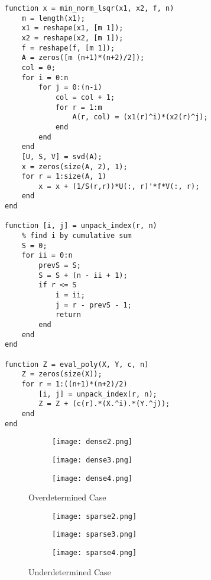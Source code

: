 \documentclass{template}
\begin{document}
\begin{verbatim}
function x = min_norm_lsqr(x1, x2, f, n)
    m = length(x1);
    x1 = reshape(x1, [m 1]);
    x2 = reshape(x2, [m 1]);
    f = reshape(f, [m 1]);
    A = zeros([m (n+1)*(n+2)/2]);
    col = 0;
    for i = 0:n
        for j = 0:(n-i)
            col = col + 1;
            for r = 1:m
                A(r, col) = (x1(r)^i)*(x2(r)^j);
            end
        end
    end
    [U, S, V] = svd(A);
    x = zeros(size(A, 2), 1);
    for r = 1:size(A, 1)
        x = x + (1/S(r,r))*U(:, r)'*f*V(:, r);
    end
end

function [i, j] = unpack_index(r, n)
    % find i by cumulative sum
    S = 0;
    for ii = 0:n
        prevS = S;
        S = S + (n - ii + 1);
        if r <= S
            i = ii;
            j = r - prevS - 1;
            return
        end
    end
end

function Z = eval_poly(X, Y, c, n)
    Z = zeros(size(X));
    for r = 1:((n+1)*(n+2)/2)
        [i, j] = unpack_index(r, n);
        Z = Z + (c(r).*(X.^i).*(Y.^j));
    end
end
\end{verbatim}

\begin{figure}[h]
    \centering
    \begin{subfigure}{0.48\textwidth}
        \texttt{[image: dense2.png]}
        \caption{}
        \label{}
    \end{subfigure}
    \begin{subfigure}{0.48\textwidth}
        \texttt{[image: dense3.png]}
        \caption{}
        \label{}
    \end{subfigure}

    \begin{subfigure}{0.48\textwidth}
        \texttt{[image: dense4.png]}
        \caption{}
        \label{}
    \end{subfigure}
    \caption{Overdetermined Case}
    \label{fig:overdetermined}
\end{figure}

\begin{figure}[h]
    \centering
    \begin{subfigure}{0.48\textwidth}
        \texttt{[image: sparse2.png]}
        \caption{}
        \label{}
    \end{subfigure}
    \begin{subfigure}{0.48\textwidth}
        \texttt{[image: sparse3.png]}
        \caption{}
        \label{}
    \end{subfigure}

    \begin{subfigure}{0.48\textwidth}
        \texttt{[image: sparse4.png]}
        \caption{}
        \label{}
    \end{subfigure}
    \caption{Underdetermined Case}
    \label{fig:Underdetermined}
\end{figure}
\end{document}
